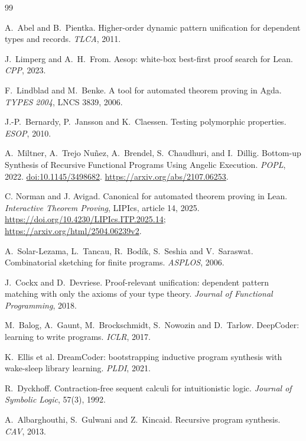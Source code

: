 \begin{thebibliography}{99}\small



 A.~Abel and B.~Pientka. Higher-order dynamic pattern unification for dependent types and records. \emph{TLCA}, 2011.

 J.~Limperg and A.~H.~From. Aesop: white-box best-first proof search for Lean. \emph{CPP}, 2023.

 F.~Lindblad and M.~Benke. A tool for automated theorem proving in Agda. \emph{TYPES 2004}, LNCS 3839, 2006.

 J.-P.~Bernardy, P.~Jansson and K.~Claessen. Testing polymorphic properties. \emph{ESOP}, 2010.

 A.~Miltner, A.~Trejo Nu\~nez, A.~Brendel, S.~Chaudhuri, and I.~Dillig.
Bottom-up Synthesis of Recursive Functional Programs Using Angelic Execution.
\emph{POPL}, 2022.
\href{https://doi.org/10.1145/3498682}{doi:10.1145/3498682}.
\url{https://arxiv.org/abs/2107.06253}.

 C. Norman and J. Avigad.
Canonical for automated theorem proving in Lean.
\emph{Interactive Theorem Proving}, LIPIcs, article 14, 2025.
\url{https://doi.org/10.4230/LIPIcs.ITP.2025.14};
\url{https://arxiv.org/html/2504.06239v2}.

 A.~Solar-Lezama, L.~Tancau, R.~Bod\'ik, S.~Seshia and V.~Saraswat. Combinatorial sketching for finite programs. \emph{ASPLOS}, 2006.

 J.~Cockx and D.~Devriese. Proof-relevant unification: dependent pattern matching with only the axioms of your type theory. \emph{Journal of Functional Programming}, 2018.

 M.~Balog, A.~Gaunt, M.~Brockschmidt, S.~Nowozin and D.~Tarlow. DeepCoder: learning to write programs. \emph{ICLR}, 2017.

 K.~Ellis et al. DreamCoder: bootstrapping inductive program synthesis with wake-sleep library learning. \emph{PLDI}, 2021.

 R.~Dyckhoff. Contraction-free sequent calculi for intuitionistic logic. \emph{Journal of Symbolic Logic}, 57(3), 1992.

 A.~Albarghouthi, S.~Gulwani and Z.~Kincaid. Recursive program synthesis. \emph{CAV}, 2013.


\end{thebibliography}
